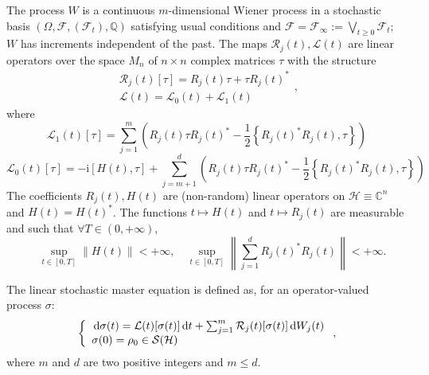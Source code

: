 \begin{assumption}\label{assump:condition}
	 The process $W$ is a continuous $m$-dimensional Wiener process in a stochastic basis $\left(\Omega, \mathcal{F},\left(\mathcal{F}_{t}\right), \mathbb{Q}\right)$ satisfying usual conditions and $\mathcal{F}=\mathcal{F}_{\infty}:=\bigvee_{t \geq 0} \mathcal{F}_{t} $; $ W $ has increments independent of the past. The maps $\mathcal{R}_{j}(t), \mathcal{L}(t)$ are linear operators over the space $M_{n}$ of $n \times n$ complex matrices $\tau$ with the structure
	\[ \begin{array}{c}\mathcal{R}_{j}(t)[\tau]=R_{j}(t) \tau+\tau R_{j}(t)^{*} \\ \mathcal{L}(t)=\mathcal{L}_{0}(t)+\mathcal{L}_{1}(t)\end{array}, \] where
	\[ 	\mathcal{L}_{1}(t)[\tau]=\sum_{j=1}^{m}\left(R_{j}(t) \tau R_{j}(t)^{*}-\frac{1}{2}\left\{R_{j}(t)^{*} R_{j}(t), \tau\right\}\right) \] \[ \mathcal{L}_{0}(t)[\tau]=-\mathrm{i}[H(t), \tau]+\sum_{j=m+1}^{d}\left(R_{j}(t) \tau R_{j}(t)^{*}-\frac{1}{2}\left\{R_{j}(t)^{*} R_{j}(t), \tau\right\}\right)  \]
	The coefficients $R_{j}(t), H(t)$ are (non-random) linear operators on $\mathcal{H} \equiv \mathbb{C}^{n}$ and $H(t)=H(t)^{*} $. The functions $t \mapsto H(t)$ and $t \mapsto R_{j}(t)$ are measurable and such that $\forall T \in(0,+\infty)$,
	\begin{equation}\label{cond:bounded}
	\quad \sup _{t \in[0, T]}\|H(t)\|<+\infty, \quad \sup _{t \in[0, T]}\left\|\sum_{j=1}^{d} R_{j}(t)^{*} R_{j}(t)\right\|<+\infty .
	\end{equation}
\end{assumption}

The linear stochastic master equation is defined as, for an operator-valued process $\sigma:$
\begin{equation}
\left\{\begin{array}{l}\,\mathrm{d} \sigma(t)=\mathcal{L}(t)[\sigma(t)] \,\mathrm{d} t+\sum_{j=1}^{m} \mathcal{R}_{j}(t)[\sigma(t)] \,\mathrm{d} W_{j}(t) \\ \sigma(0)=\rho_{0} \in \mathcal{S}(\mathcal{H})\end{array}\right.
\label{eq:linear_master_SDE},
\end{equation}
where $ m $ and $ d $ are two positive integers and $ m \le d $.

